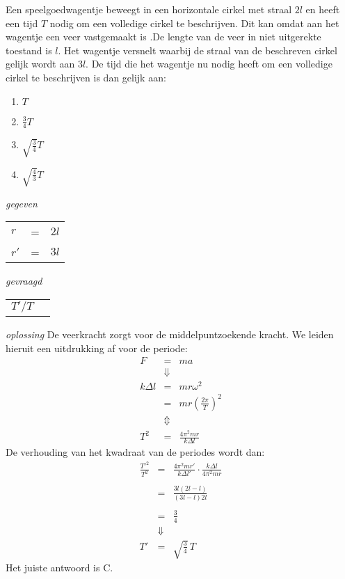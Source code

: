 \begin{exercise} Een speelgoedwagentje beweegt in een horizontale cirkel met straal
$2l$ en heeft een tijd $T$ nodig om een volledige cirkel te
beschrijven. Dit kan omdat aan het wagentje een veer vastgemaakt is
.De lengte van de veer in niet uitgerekte toestand is $l$. Het
wagentje versnelt waarbij de straal van de beschreven cirkel gelijk
wordt aan $3l$.
\newline
De tijd die het wagentje nu nodig heeft om een volledige cirkel te
beschrijven is dan gelijk aan:
\begin{enumerate}
\item $T$
\item $\frac{3}{4}T$
\item $\sqrt{\frac{3}{4}}T$
\item $\sqrt{\frac{4}{3}}T$
\end{enumerate}
\begin{oplossing}
\item[\textit{gegeven}]
\begin{tabular}[t]{lcl}
$r$&=&$2l$\\
$r'$&=&$3l$\\
\end{tabular}
\item [\textit{gevraagd}]
\begin{tabular}[t]{ll}
$T'/T$
\end{tabular}
\item [\textit{oplossing}]De veerkracht zorgt voor de middelpuntzoekende kracht. We leiden hieruit een uitdrukking af voor de periode:
\begin{eqnarray*}
F&=&ma\\
&\Downarrow&\\
k\Delta l &=& mr\omega^2\\
&=&  mr\left(\frac{2\pi}{T}\right)^2\\
&\Updownarrow&\\
T^2&=&\frac{4\pi^2mr}{k\Delta l}
\end{eqnarray*}
De verhouding van het kwadraat van de periodes wordt dan:
\begin{eqnarray*}
\frac{T'^2}{T^2}&=&\frac{4\pi^2mr'}{k\Delta l'}\cdot\frac{k\Delta l}{4\pi^2mr}\\
&&\\
&=&\frac{3l(2l-l)}{(3l-l)2l}\\
&&\\
&=&\frac{3}{4}\\
&\Downarrow&\\
T'&=&\sqrt{\frac{3}{4}}\,T
\end{eqnarray*}
Het juiste antwoord is C.
\end{oplossing}





\end{exercise}

